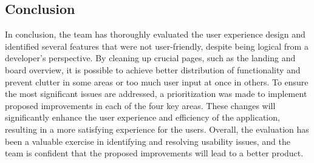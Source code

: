\subsection{Conclusion}
\indent In conclusion, the team has thoroughly evaluated the user experience design and identified several features that were not user-friendly, despite being logical from a developer's perspective. By cleaning up crucial pages, such as the landing and board overview, it is possible to achieve better distribution of functionality and prevent clutter in some areas or too much user input at once in others. To ensure the most significant issues are addressed, a prioritization was made to implement proposed improvements in each of the four key areas. These changes will significantly enhance the user experience and efficiency of the application, resulting in a more satisfying experience for the users. Overall, the evaluation has been a valuable exercise in identifying and resolving usability issues, and the team is confident that the proposed improvements will lead to a better product.